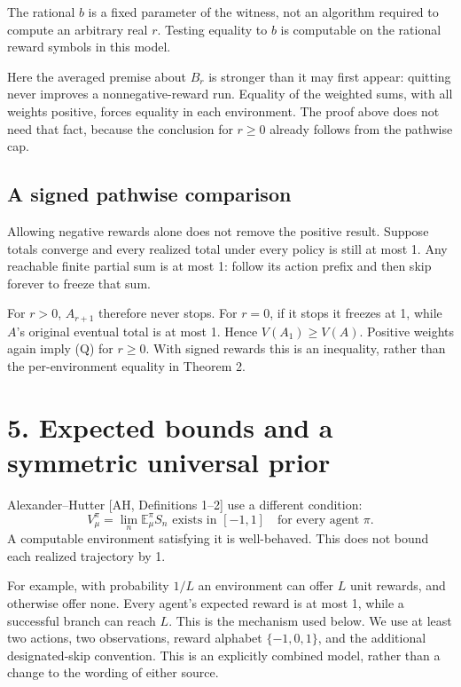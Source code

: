 \documentclass[
  11pt,
  letterpaper,
]{article}
\newcounter{none} %
\begin{document}
The rational \(b\) is a fixed parameter of the witness, not an algorithm
required to compute an arbitrary real \(r\). Testing equality to \(b\)
is computable on the rational reward symbols in this model.

Here the averaged premise about \(B_r\) is stronger than it may first
appear: quitting never improves a nonnegative-reward run. Equality of
the weighted sums, with all weights positive, forces equality in each
environment. The proof above does not need that fact, because the
conclusion for \(r\geq0\) already follows from the pathwise cap.

\subsection{A signed pathwise
comparison}\label{a-signed-pathwise-comparison}

Allowing negative rewards alone does not remove the positive result.
Suppose totals converge and every realized total under every policy is
still at most 1. Any reachable finite partial sum is at most 1: follow
its action prefix and then skip forever to freeze that sum.

For \(r>0\), \(A_{r+1}\) therefore never stops. For \(r=0\), if it stops
it freezes at 1, while \(A\)'s original eventual total is at most 1.
Hence \(V(A_1)\geq V(A)\). Positive weights again imply (Q) for
\(r\geq0\). With signed rewards this is an inequality, rather than the
per-environment equality in Theorem 2.

\section{5. Expected bounds and a symmetric universal
prior}\label{expected-bounds-and-a-symmetric-universal-prior}

Alexander--Hutter {[}AH, Definitions 1--2{]} use a different condition:
\[
 V_\mu^\pi=\lim_n\mathbb E_\mu^\pi S_n
                         \text{ exists in }[-1,1]
                    \quad\text{for every agent }\pi.
\] A computable environment satisfying it is well-behaved. This does not
bound each realized trajectory by 1.

For example, with probability \(1/L\) an environment can offer \(L\)
unit rewards, and otherwise offer none. Every agent's expected reward is
at most 1, while a successful branch can reach \(L\). This is the
mechanism used below. We use at least two actions, two observations,
reward alphabet \(\{-1,0,1\}\), and the additional designated-skip
convention. This is an explicitly combined model, rather than a change
to the wording of either source.
\end{document}
